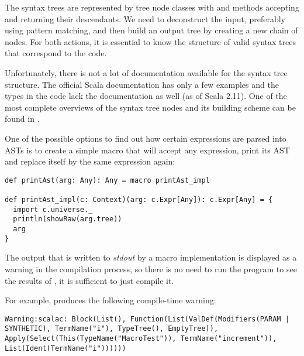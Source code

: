 The syntax trees are represented by tree node classes with  and  methods accepting and returning their descendants. We need to deconstruct the input, preferably using pattern matching, and then build an output tree by creating a new chain of nodes. For both actions, it is essential to know the structure of valid syntax trees that correspond to the code.

Unfortunately, there is not a lot of documentation available for the syntax tree structure. The official Scala documentation has only a few examples and the types in the code lack the documentation as well (as of Scala 2.11). One of the most complete overviews of the syntax tree nodes and its building scheme can be found in \cite{noauthor_wolfe:_2017}.

One of the possible options to find out how certain expressions are parsed into ASTs is to create a simple macro that will accept any expression, print its AST and replace itself by the same expression again:

\lstset{style=Scala}
\begin{lstlisting}
def printAst(arg: Any): Any = macro printAst_impl

def printAst_impl(c: Context)(arg: c.Expr[Any]): c.Expr[Any] = {
  import c.universe._
  println(showRaw(arg.tree))
  arg
}
\end{lstlisting}

The output that is written to \textit{stdout} by a macro implementation is displayed as a warning in the compilation process, so there is no need to run the program to see the results of , it is sufficient to just compile it.

For example,  produces the following compile-time warning:

\lstset{style=Dump}
\begin{lstlisting}
Warning:scalac: Block(List(), Function(List(ValDef(Modifiers(PARAM | SYNTHETIC), TermName("i"), TypeTree(), EmptyTree)), Apply(Select(This(TypeName("MacroTest")), TermName("increment")), List(Ident(TermName("i"))))))
\end{lstlisting}


